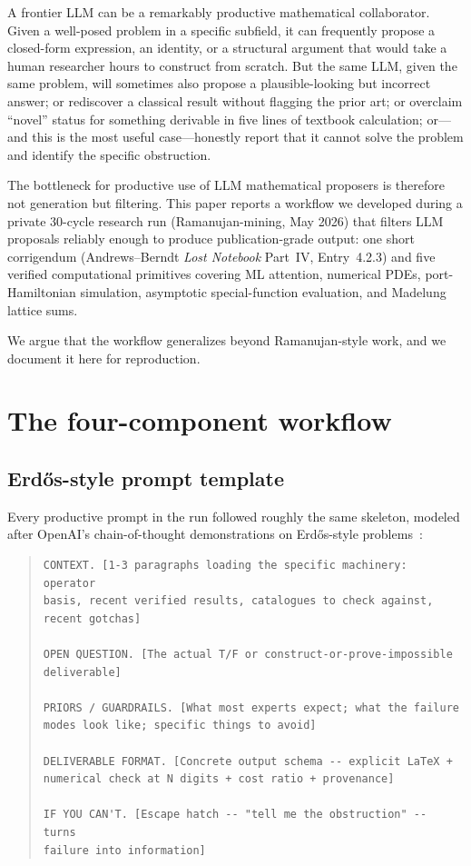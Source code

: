 \documentclass[11pt,reqno]{amsart}
\theoremstyle{definition}
\begin{document}
A frontier LLM can be a remarkably productive mathematical
collaborator. Given a well-posed problem in a specific subfield, it
can frequently propose a closed-form expression, an identity, or a
structural argument that would take a human researcher hours to
construct from scratch. But the same LLM, given the same problem,
will sometimes also propose a plausible-looking but incorrect answer;
or rediscover a classical result without flagging the prior art; or
overclaim ``novel'' status for something derivable in five lines of
textbook calculation; or---and this is the most useful case---honestly
report that it cannot solve the problem and identify the specific
obstruction.

The bottleneck for productive use of LLM mathematical proposers is
therefore not generation but filtering. This paper reports a workflow
we developed during a private 30-cycle research run (Ramanujan-mining,
May 2026) that filters LLM proposals reliably enough to produce
publication-grade output: one short corrigendum (Andrews--Berndt
\emph{Lost Notebook} Part~IV, Entry~4.2.3) and five verified
computational primitives covering ML attention, numerical PDEs,
port-Hamiltonian simulation, asymptotic special-function evaluation,
and Madelung lattice sums.

We argue that the workflow generalizes beyond Ramanujan-style work,
and we document it here for reproduction.

\section{The four-component workflow}\label{sec:workflow}

\subsection{Erd\H{o}s-style prompt template}\label{sec:prompt-template}

Every productive prompt in the run followed roughly the same skeleton,
modeled after OpenAI's chain-of-thought demonstrations on
Erd\H{o}s-style problems~\cite{OpenAIErdos2026}:

\begin{quote}
\begin{verbatim}
CONTEXT. [1-3 paragraphs loading the specific machinery: operator
basis, recent verified results, catalogues to check against,
recent gotchas]

OPEN QUESTION. [The actual T/F or construct-or-prove-impossible
deliverable]

PRIORS / GUARDRAILS. [What most experts expect; what the failure
modes look like; specific things to avoid]

DELIVERABLE FORMAT. [Concrete output schema -- explicit LaTeX +
numerical check at N digits + cost ratio + provenance]

IF YOU CAN'T. [Escape hatch -- "tell me the obstruction" -- turns
failure into information]
\end{verbatim}
\end{quote}
\end{document}
